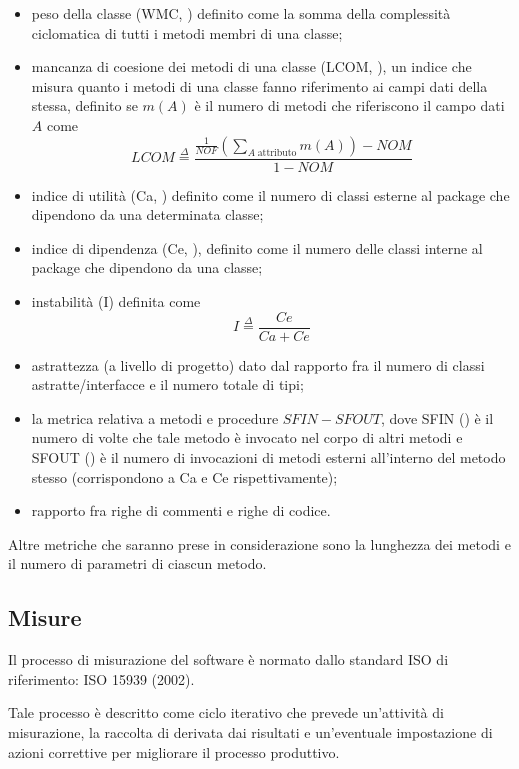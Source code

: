 \begin{itemize}
  \item peso della classe (WMC, ) definito come la somma della complessità ciclomatica di tutti i metodi membri di una classe;
  \item mancanza di coesione dei metodi di una classe (LCOM, ), un indice che misura quanto i metodi di una classe fanno riferimento ai campi dati della stessa, definito se $m(A)$ è il numero di metodi che riferiscono il campo dati $A$ come \[
  LCOM \stackrel{\Delta}{=} \frac{\frac{1}{NOF}\left(\displaystyle\sum_{A\;\mathrm{attributo}}{m(A)}\right) - NOM}{1-NOM}
  \]
  \item indice di utilità (Ca, ) definito come il numero di classi esterne al package che dipendono da una determinata classe;
  \item indice di dipendenza (Ce, ), definito come il numero delle classi interne al package che dipendono da una classe;
  \item instabilità (I) definita come \[
  I \stackrel{\Delta}{=} \frac{Ce}{Ca + Ce}
  \]
  \item astrattezza (a livello di progetto) dato dal rapporto fra il numero di classi astratte/interfacce e il numero totale di tipi;
  \item la metrica relativa a metodi e procedure $SFIN - SFOUT$, dove SFIN () è il numero di volte che tale metodo è invocato nel corpo di altri metodi e SFOUT () è il numero di invocazioni di metodi esterni all'interno del metodo stesso (corrispondono a Ca e Ce rispettivamente);
  \item rapporto fra righe di commenti e righe di codice.
\end{itemize}

Altre metriche che saranno prese in considerazione sono la lunghezza dei metodi e il numero di parametri di ciascun metodo.

\subsection{Misure}
Il processo di misurazione del software è normato dallo standard ISO di riferimento: ISO 15939  (2002).

Tale processo è descritto come ciclo iterativo che prevede un'attività di misurazione, la raccolta di  derivata dai risultati e un'eventuale impostazione di azioni correttive per migliorare il processo produttivo.

